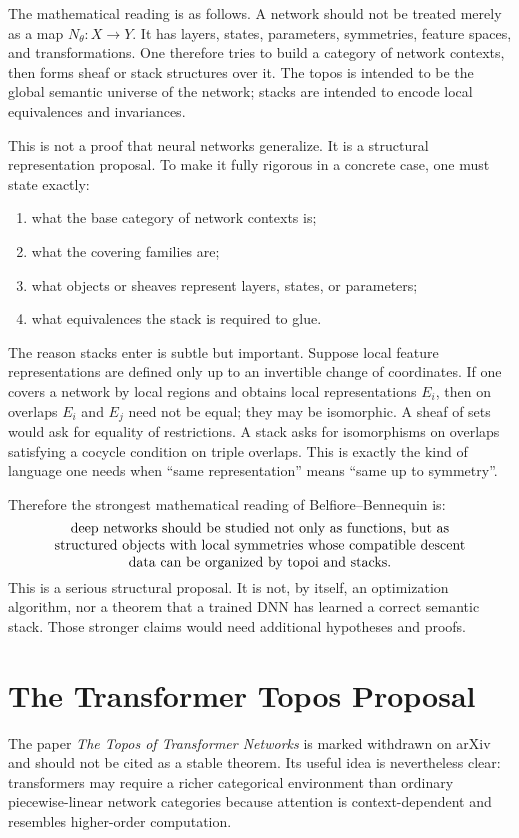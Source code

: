 \documentclass[11pt]{article}
\begin{document}
The mathematical reading is as follows. A network should not be treated merely
as a map \(N_\theta:X\to Y\). It has layers, states, parameters, symmetries,
feature spaces, and transformations. One therefore tries to build a category of
network contexts, then forms sheaf or stack structures over it. The topos is
intended to be the global semantic universe of the network; stacks are intended
to encode local equivalences and invariances.

This is not a proof that neural networks generalize. It is a structural
representation proposal. To make it fully rigorous in a concrete case, one must
state exactly:
\begin{enumerate}
\item what the base category of network contexts is;
\item what the covering families are;
\item what objects or sheaves represent layers, states, or parameters;
\item what equivalences the stack is required to glue.
\end{enumerate}

The reason stacks enter is subtle but important. Suppose local feature
representations are defined only up to an invertible change of coordinates. If
one covers a network by local regions and obtains local representations
\(E_i\), then on overlaps \(E_i\) and \(E_j\) need not be equal; they may be
isomorphic. A sheaf of sets would ask for equality of restrictions. A stack asks
for isomorphisms on overlaps satisfying a cocycle condition on triple overlaps.
This is exactly the kind of language one needs when ``same representation''
means ``same up to symmetry''.

Therefore the strongest mathematical reading of Belfiore--Bennequin is:
\[
\parbox{0.86\textwidth}{\centering
deep networks should be studied not only as functions, but as structured
objects with local symmetries whose compatible descent data can be organized by
topoi and stacks.}
\]
This is a serious structural proposal. It is not, by itself, an optimization
algorithm, nor a theorem that a trained DNN has learned a correct semantic
stack. Those stronger claims would need additional hypotheses and proofs.

\section{The Transformer Topos Proposal}

The paper \emph{The Topos of Transformer Networks} is marked withdrawn on arXiv
and should not be cited as a stable theorem. Its useful idea is nevertheless
clear: transformers may require a richer categorical environment than ordinary
piecewise-linear network categories because attention is context-dependent and
resembles higher-order computation.
\end{document}
